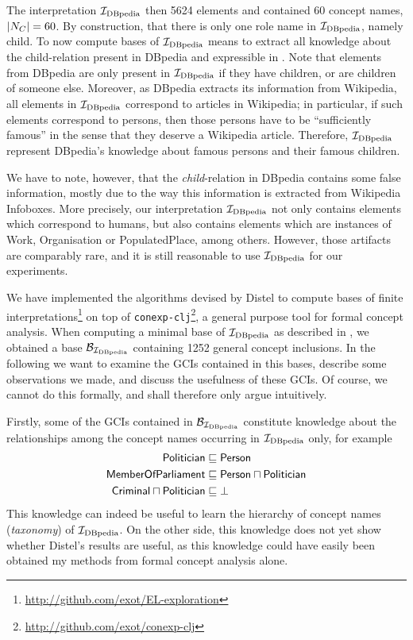 The interpretation ${\mathcal{I}_{\text{DBpedia}}}$ then 5624 elements and contained 60 concept names, \ie
$\lvert N_C \rvert = 60$.  By construction, that there is only one role name in ${\mathcal{I}_{\text{DBpedia}}}$,
namely \textsf{child}.  To now compute bases of ${\mathcal{I}_{\text{DBpedia}}}$ means to extract all knowledge
about the child-relation present in DBpedia and expressible in \ELbot.  Note that elements
from DBpedia are only present in ${\mathcal{I}_{\text{DBpedia}}}$ if they have children, or are children of
someone else.  Moreover, as DBpedia extracts its information from Wikipedia, all elements
in ${\mathcal{I}_{\text{DBpedia}}}$ correspond to articles in Wikipedia; in particular, if such elements
correspond to persons, then those persons have to be ``sufficiently famous'' in the sense
that they deserve a Wikipedia article.  Therefore, ${\mathcal{I}_{\text{DBpedia}}}$ represent DBpedia's
knowledge about famous persons and their famous children.

We have to note, however, that the \emph{child}-relation in DBpedia contains some false
information, mostly due to the way this information is extracted from Wikipedia Infoboxes.
More precisely, our interpretation ${\mathcal{I}_{\text{DBpedia}}}$ not only contains elements which correspond
to humans, but also contains elements which are instances of \textsf{Work},
\textsf{Organisation} or \textsf{PopulatedPlace}, among others.  However, those artifacts
are comparably rare, and it is still reasonable to use ${\mathcal{I}_{\text{DBpedia}}}$ for our experiments.

We have implemented the algorithms devised by Distel to compute bases of finite
interpretations\footnote{\url{http://github.com/exot/EL-exploration}} on top of
\texttt{conexp-clj}\footnote{\url{http://github.com/exot/conexp-clj}}, a general purpose
tool for formal concept analysis.  When computing a minimal base of ${\mathcal{I}_{\text{DBpedia}}}$ as
described in , we obtained a base $\mathcal{B}_{{\mathcal{I}_{\text{DBpedia}}}}$
containing 1252 general concept inclusions.  In the following we want to examine the GCIs
contained in this bases, describe some observations we made, and discuss the usefulness of
these GCIs.  Of course, we cannot do this formally, and shall therefore only argue
intuitively.

Firstly, some of the GCIs contained in $\mathcal{B}_{\mathcal{I}_{\text{DBpedia}}}$ constitute knowledge about
the relationships among the concept names occurring in ${\mathcal{I}_{\text{DBpedia}}}$ only, for example
\begin{align*}
  \sf Politician &\sqsubseteq \sf Person \\
  \sf MemberOfParliament &\sqsubseteq \sf Person \sqcap Politician \\
  \sf Criminal \sqcap Politician &\sqsubseteq \bot
\end{align*}
This knowledge can indeed be useful to learn the hierarchy of concept names
(\emph{taxonomy}) of ${\mathcal{I}_{\text{DBpedia}}}$.  On the other side, this knowledge does not yet show
whether Distel's results are useful, as this knowledge could have easily been obtained my
methods from formal concept analysis alone.

